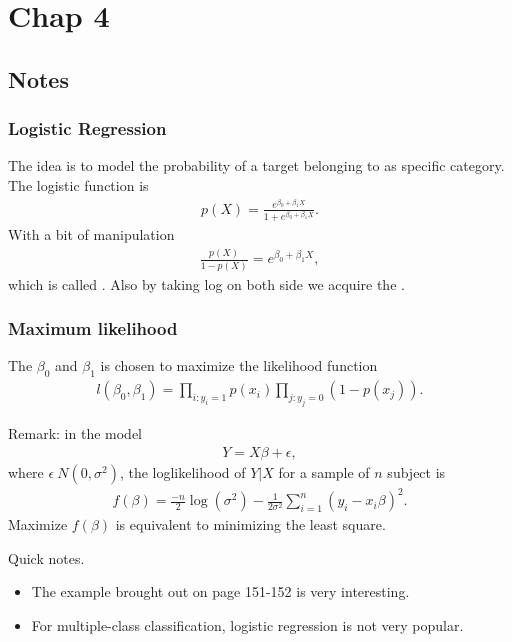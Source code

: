 \section{Chap 4}
\subsection{Notes}
\subsubsection{Logistic Regression}
The idea is to model the probability of a target belonging to as specific category. The logistic function is
\begin{align}
p(X) = \frac{e^{\beta_0 + \beta_1X}}{1 + e^{\beta_0 + \beta_1X}}.
\end{align}
With a bit of manipulation
\begin{align}
\frac{p(X)}{1-p(X)} = e^{\beta_0 + \beta_1X},
\end{align}
which is called . Also by taking log on both side we acquire the .
\subsubsection{Maximum likelihood}
The $\beta_0$ and $\beta_1$ is chosen to maximize the likelihood function
\begin{align}
l(\beta_0, \beta_1) = \prod_{i:y_i=1}p(x_i)\prod_{j:y_j=0}(1-p(x_j)).
\end{align}
\begin{tbox}
Remark: in the model 
\begin{align}
Y = X\beta + \epsilon,
\end{align}
where $\epsilon ~ N(0, \sigma^2)$, the loglikelihood of $Y|X$ for a sample of $n$ subject is \begin{align}
f(\beta) = \frac{-n}{2}\log(\sigma^2) - \frac{1}{2\sigma^2}\sum_{i=1}^{n}(y_i -x_i\beta)^2.
\end{align}
Maximize $f(\beta)$ is equivalent to minimizing the least square.
\end{tbox}
\begin{tbox}
Quick notes.
	\begin{itemize}
		\item The example brought out on page 151-152 is very interesting.
		\item For multiple-class classification, logistic regression is not very popular.
	\end{itemize}
\end{tbox}
